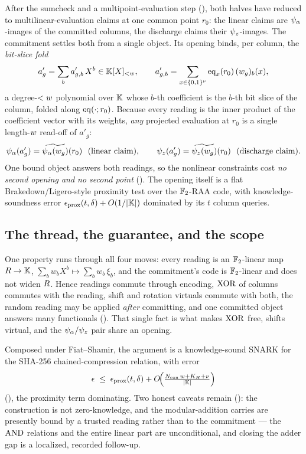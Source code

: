 After the sumcheck and a multipoint-evaluation step (),
both halves have reduced to multilinear-evaluation claims at one common point
$r_0$: the linear claims are $\psi_{\alpha}$-images of the committed columns, the
discharge claims their $\psi_{z}$-images. The commitment settles both from a single
object. Its opening binds, per column, the \emph{bit-slice fold}
\[
  a'_g = \sum_{b} a'_{g,b}\,X^b \in \mathbb{K}[X]_{<w},
  \qquad
  a'_{g,b} = \sum_{x\in\{0,1\}^{\nu}} \operatorname{eq}_x(r_0)\,(w_g)_b(x),
\]
a degree-$<w$ polynomial over $\mathbb{K}$ whose $b$-th coefficient is the $b$-th
bit slice of the column, folded along $\operatorname{eq}(\cdot;r_0)$. Because every reading is
the inner product of the coefficient vector with its weights, \emph{any}
projected evaluation at $r_0$ is a single length-$w$ read-off of $a'_g$:
\[
  \psia(a'_g) = \mle{\psia(w_g)}(r_0)\ \ (\text{linear claim}),
  \qquad
  \psiz(a'_g) = \mle{\psiz(w_g)}(r_0)\ \ (\text{discharge claim}).
\]
One bound object answers both readings, so the nonlinear constraints cost
\emph{no second opening and no second point} (). The
opening itself is a flat Brakedown/Ligero-style proximity test
\cite{brakedown} over the $\mathbb{F}_2$-RAA code, with knowledge-soundness error
$\epsilon_{\mathrm{prox}}(t,\delta) + O(1/|\mathbb{K}|)$ dominated by its $t$ column
queries.

\subsection{The thread, the guarantee, and the scope}
\label{sec:overview-thread}

One property runs through all four moves: every reading is an $\mathbb{F}_2$-linear map
$R\to\mathbb{K}$, $\sum_b w_b X^b \mapsto \sum_b w_b\,\xi_b$, and the
commitment's code is $\mathbb{F}_2$-linear and does not widen $R$. Hence
readings commute through encoding, $\operatorname{XOR}$ of columns commutes with the reading,
shift and rotation virtuals commute with both, the random reading may be applied
\emph{after} committing, and one committed object answers many functionals
(). That single fact is what makes $\operatorname{XOR}$ free,
shifts virtual, and the $\psi_{\alpha}/\psi_{z}$ pair share an opening.

Composed under Fiat--Shamir, the argument is a knowledge-sound SNARK for the
SHA-256 chained-compression relation, with error
\[
  \epsilon \;\le\; \epsilon_{\mathrm{prox}}(t,\delta)
  + O\!\Bigl(\tfrac{N_{\mathrm{con}}\,w + K_H + \nu}{|\mathbb{K}|}\Bigr)
\]
(), the proximity term dominating. Two honest caveats remain
(): the construction is not zero-knowledge, and the
modular-addition carries are presently bound by a trusted reading rather than to
the commitment --- the $\operatorname{AND}$ relations and the entire linear part are
unconditional, and closing the adder gap is a localized, recorded follow-up.
